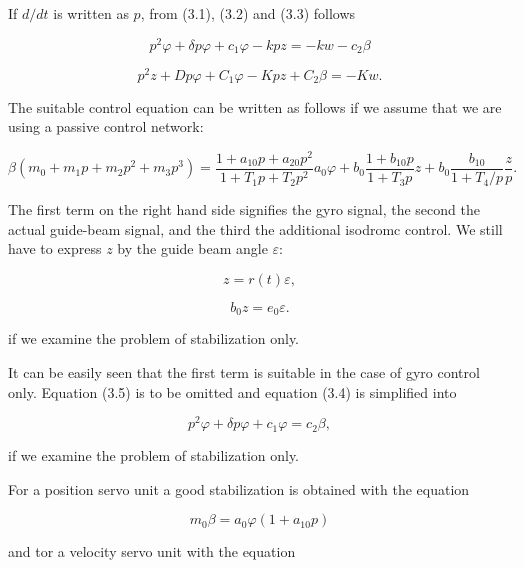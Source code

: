 \documentclass[12pt, a4paper]{article}
\begin{document}
If $d/dt$ is written as $p$, from (3.1), (3.2) and (3.3) follows

\begin{equation}
  p^{2}\varphi+\delta p\varphi+c_{1}\varphi-kpz=-kw-c_{2}\beta
\end{equation}

\begin{equation}
  p^{2}z+D p\varphi+C_{1}\varphi-Kpz+C_{2}\beta=-Kw.
\end{equation}

The suitable control equation can be written as follows if we assume that we
are using a passive control network:

\begin{equation}
  \beta(m_{0}+m_{1}p+m_{2}p^{2}+m_{3}p^{3})=\frac{1+a_{10}p+a_{20}p^{2}}{1+T_{1}p+T_{2}p^{2}}a_{0}\varphi+b_{0}\frac{1+b_{10}p}{1+T_{3}p}z+b_{0}\frac{b_{10}}{1+T_{4}/p}\frac{z}{p}.
\end{equation}

The first term on the right hand side signifies the gyro signal, the second the actual guide-beam signal, and the third the additional isodromc control. We still have to express $z$ by the guide beam angle $\varepsilon$:

\begin{equation}
  z=r(t)\varepsilon,
\end{equation}

\begin{equation}
  b_{0}z=e_{0}\varepsilon.
\end{equation}

if we examine the problem of stabilization only.

It can be easily seen that the first term is suitable in the case of gyro control only. Equation (3.5) is to be omitted and equation (3.4) is simplified into

\begin{equation}
  p^{2}\varphi+\delta p\varphi+c_{1}\varphi=c_{2}\beta,
\end{equation}

if we examine the problem of stabilization only.

For a position servo unit a good stabilization is obtained with the equation

\begin{equation}
  m_{0}\beta=a_{0}\varphi(1+a_{10}p)
\end{equation}

and tor a velocity servo unit with the equation
\end{document}
